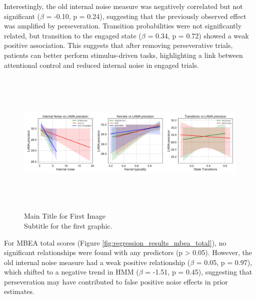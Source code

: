 Interestingly, the old internal noise measure was negatively correlated but not significant ($\beta$ = -0.10, p = 0.24), suggesting that the previously observed effect was amplified by perseveration. Transition probabilities were not significantly related, but transition to the engaged state ($\beta$ = 0.34, p = 0.72) showed a weak positive association. This suggests that after removing perseverative trials, patients can better perform stimulus-driven tasks, highlighting a link between attentional control and reduced internal noise in engaged trials.
\begin{figure}[H]
    \centering
    \includegraphics[width=17cm,height=7cm]{MainLayout/Images/chapter8/regression_results_lama_prec.jpg}
    \caption{Main Title for First Image \\ \small Subtitle for the first graphic.}
    \label{fig:regression_results_lama_prec}
\end{figure}
For MBEA total scores (Figure \ref{fig:regression_results_mbea_total}), no significant relationships were found with any predictors (p > 0.05). However, the old internal noise measure had a weak positive relationship ($\beta$ = 0.05, p = 0.97), which shifted to a negative trend in HMM ($\beta$ = -1.51, p = 0.45), suggesting that perseveration may have contributed to false positive noise effects in prior estimates.

